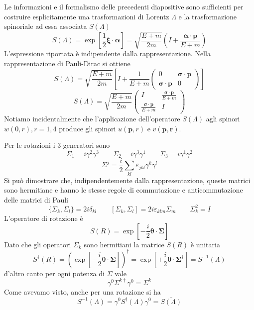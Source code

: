 Le informazioni e il formalismo delle precedenti diapositive sono sufficienti per costruire esplicitamente una trasformazioni di Lorentz $\Lambda$ e la trasformazione spinoriale ad essa associata $S(\Lambda)$
$$
S(\Lambda) = \exp \left[ \frac{1}{2} \boldsymbol{\xi} \cdot \boldsymbol{\alpha} \right] = \sqrt{\frac{E+m}{2m}} \left( I + \frac{\boldsymbol{\alpha} \cdot \mathbf{p}}{E+m} \right)
$$
L'espressione riportata è indipendente dalla rappresentazione. Nella rappresentazione di Pauli-Dirac si ottiene
$$
S(\Lambda) = \sqrt{\frac{E+m}{2m}} \left[ I + \frac{1}{E+m} \begin{pmatrix} 0 & \boldsymbol{\sigma} \cdot \mathbf{p} \\ \boldsymbol{\sigma} \cdot \mathbf{p} & 0 \end{pmatrix} \right]
$$
$$
S(\Lambda) = \sqrt{\frac{E+m}{2m}} \begin{pmatrix} I & \frac{\boldsymbol{\sigma} \cdot \mathbf{p}}{E+m} \\ \frac{\boldsymbol{\sigma} \cdot \mathbf{p}}{E+m} & I \end{pmatrix}
$$
Notiamo incidentalmente che l'applicazione dell'operatore $S(\Lambda)$ agli spinori $w(0,r), r=1,4$ produce gli spinori $u(\mathbf{p},r)$ e $v(\mathbf{p,r})$.

Per le rotazioni i 3 generatori sono
$$
\Sigma_1 = i\gamma^2\gamma^3 \qquad \Sigma_2 = i\gamma^3\gamma^1 \qquad \Sigma_3 = i\gamma^1\gamma^2
$$
$$
\Sigma^j = \frac{i}{2} \sum_{kl} \varepsilon_{jkl} \gamma^k \gamma^l
$$
Si può dimostrare che, indipendentemente dalla rappresentazione, queste matrici sono hermitiane e hanno le stesse regole di commutazione e anticommutazione delle matrici di Pauli
$$
\{\Sigma_k, \Sigma_l\} = 2i\delta_{kl} \qquad [\Sigma_k, \Sigma_l] = 2i\varepsilon_{klm}\Sigma_m \qquad \Sigma_k^2 = I
$$
L'operatore di rotazione è
$$
S(R) = \exp \left[ -\frac{i}{2} \boldsymbol{\theta} \cdot \boldsymbol{\Sigma} \right]
$$
Dato che gli operatori $\Sigma_k$ sono hermitiani la matrice $S(R)$ è unitaria
$$
S^\dagger(R) = \left( \exp \left[ -\frac{i}{2} \boldsymbol{\theta} \cdot \boldsymbol{\Sigma} \right] \right)^\dagger = \exp \left[ +\frac{i}{2} \boldsymbol{\theta} \cdot \boldsymbol{\Sigma}^\dagger \right] = S^{-1}(\Lambda)
$$
d'altro canto per ogni potenza di $\Sigma$ vale
$$
\gamma^0 \Sigma^{k\dagger} \gamma^0 = \Sigma^k
$$
Come avevamo visto, anche per una rotazione si ha
$$
S^{-1}(\Lambda) = \gamma^0 S^\dagger(\Lambda) \gamma^0 = \overline{S(\Lambda)}
$$
